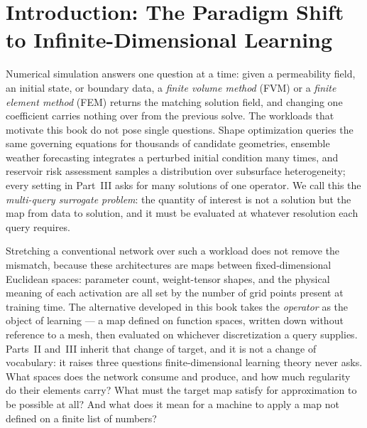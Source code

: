
\chapter{Introduction: The Paradigm Shift to Infinite-Dimensional Learning}
\label{ch:part1-introduction-the-paradigm-shift-to-infinit}
\label{sec:intro}

Numerical simulation answers one question at a time: given a permeability field, an
initial state, or boundary data, a
\emph{finite volume method} (FVM) or a
\emph{finite element method} (FEM) returns the matching
solution field, and changing one coefficient carries nothing over from the previous solve.
The workloads that motivate this book do not pose single questions. Shape optimization
queries the same governing equations for thousands of candidate geometries, ensemble weather
forecasting integrates a perturbed initial condition many times, and reservoir risk
assessment samples a distribution over subsurface heterogeneity; every setting in Part~III
asks for many solutions of one operator. We call this the
\emph{multi-query surrogate problem}: the quantity of interest is not a solution but the map from data to solution, and
it must be evaluated at whatever resolution each query requires.

Stretching a conventional network over such a workload does not remove the mismatch, because
these architectures are maps between fixed-dimensional Euclidean spaces: parameter count,
weight-tensor shapes, and the physical meaning of each activation are all set by the number
of grid points present at training time. The alternative developed in this book takes the
\emph{operator} as the object of learning --- a map defined on function spaces, written down
without reference to a mesh, then evaluated on whichever discretization a query supplies.
Parts~II and~III inherit that change of target, and it is not a change of vocabulary: it
raises three questions finite-dimensional learning theory never asks. What spaces does the
network consume and produce, and how much regularity do their elements carry? What must the
target map satisfy for approximation to be possible at all? And what does it mean for a
machine to apply a map not defined on a finite list of numbers?


